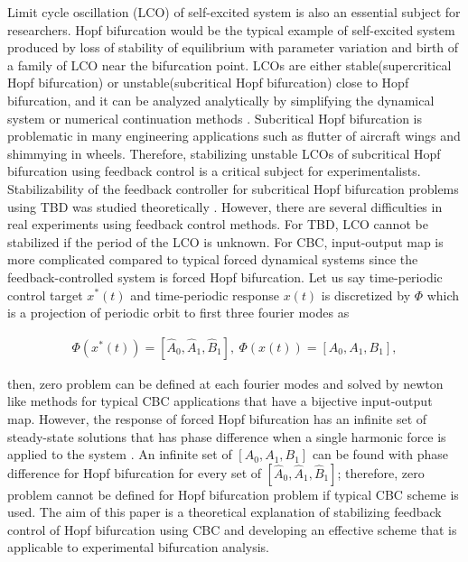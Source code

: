 \documentclass[openacc]{rsproca_new}%
\begin{document}
Limit cycle oscillation (LCO) of self-excited system is also an essential subject for researchers. Hopf bifurcation would be the typical example of self-excited system produced by loss of stability of equilibrium with parameter variation and birth of a family of LCO near the bifurcation point. LCOs are either stable(supercritical Hopf bifurcation) or unstable(subcritical Hopf bifurcation) close to Hopf bifurcation, and it can be analyzed analytically by simplifying the dynamical system \cite{yu2002simplest,ashwin1995numerical} or numerical continuation methods \cite{doedel2000auto2000,dankowicz2013recipes}. Subcritical Hopf bifurcation is problematic in many engineering applications such as flutter of aircraft wings and shimmying in wheels. Therefore, stabilizing unstable LCOs of subcritical Hopf bifurcation using feedback control is a critical subject for experimentalists. Stabilizability of the feedback controller for subcritical Hopf bifurcation problems using TBD was studied theoretically \cite{brown2011time,postlethwaite2013feedback}. However, there are several difficulties in real experiments using feedback control methods. For TBD, LCO cannot be stabilized if the period of the LCO is unknown. For CBC, input-output map is more complicated compared to typical forced dynamical systems since the feedback-controlled system is forced Hopf bifurcation. Let us say time-periodic control target $x^*(t)$ and time-periodic response $x(t)$ is discretized by $\Phi$ which is a projection of periodic orbit to first three fourier modes as

\begin{align}
 \Phi(x^*(t))=[\hat A_0,\hat A_1,\hat B_1], \: \Phi(x(t))=[A_0,A_1,B_1],
\end{align}

\noindent then, zero problem can be defined at each fourier modes and solved by newton like methods for typical CBC applications that have a bijective input-output map. However, the response of forced Hopf bifurcation has an infinite set of steady-state solutions that has phase difference when a single harmonic force is applied to the system \cite{golubitsky2009feed}. An infinite set of $[A_0,A_1,B_1]$ can be found with phase difference for Hopf bifurcation for every set of $[\hat A_0,\hat A_1,\hat B_1]$; therefore, zero problem cannot be defined for Hopf bifurcation problem if typical CBC scheme is used. The aim of this paper is a theoretical explanation of stabilizing feedback control of Hopf bifurcation using CBC and developing an effective scheme that is applicable to experimental bifurcation analysis.
\end{document}
